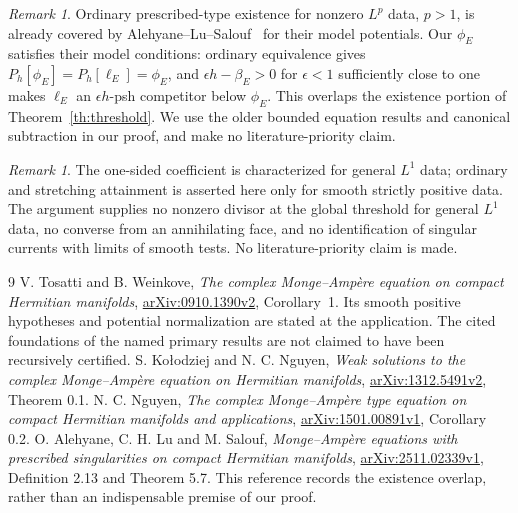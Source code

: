 \documentclass[11pt]{article}
\theoremstyle{remark}\newtheorem{remark}[theorem]{Remark}
\begin{document}
\begin{remark}
Ordinary prescribed-type existence for nonzero $L^p$ data, $p>1$,
is already covered by Alehyane--Lu--Salouf~\cite[Theorem 5.7]{ALS}
for their model potentials. Our $\phi_E$ satisfies their model
conditions: ordinary equivalence gives
$P_h[\phi_E]=P_h[\ell_E]=\phi_E$, and
$\epsilon h-\beta_E>0$ for $\epsilon<1$ sufficiently close to one
makes $\ell_E$ an $\epsilon h$-psh competitor below $\phi_E$.
This overlaps the existence portion of Theorem~\ref{th:threshold}.
We use the older bounded equation results and canonical subtraction
in our proof, and make no literature-priority claim.
\end{remark}

\begin{remark}
The one-sided coefficient is characterized for general $L^1$ data;
ordinary and stretching attainment is asserted here only for smooth
strictly positive data. The argument supplies no nonzero divisor at
the global threshold for general $L^1$ data, no converse from an
annihilating face, and no identification of singular currents with
limits of smooth tests. No literature-priority claim is made.
\end{remark}

\begin{thebibliography}{9}
 V. Tosatti and B. Weinkove,
\emph{The complex Monge--Amp\`ere equation on compact Hermitian manifolds},
\href{https://arxiv.org/abs/0910.1390v2}{arXiv:0910.1390v2},
Corollary~1. Its smooth positive hypotheses and potential normalization
are stated at the application. The cited foundations of the named
primary results are not claimed to have been recursively certified.
 S. Ko\l odziej and N. C. Nguyen,
\emph{Weak solutions to the complex Monge--Amp\`ere equation on
Hermitian manifolds}, \href{https://arxiv.org/abs/1312.5491v2}{arXiv:1312.5491v2}, Theorem 0.1.
 N. C. Nguyen,
\emph{The complex Monge--Amp\`ere type equation on compact Hermitian
manifolds and applications},
\href{https://arxiv.org/abs/1501.00891v1}{arXiv:1501.00891v1}, Corollary 0.2.
 O. Alehyane, C. H. Lu and M. Salouf,
\emph{Monge--Amp\`ere equations with prescribed singularities on
compact Hermitian manifolds},
\href{https://arxiv.org/abs/2511.02339v1}{arXiv:2511.02339v1},
Definition 2.13 and Theorem 5.7. This reference records the
existence overlap, rather than an indispensable premise of our proof.
\end{thebibliography}
\end{document}
